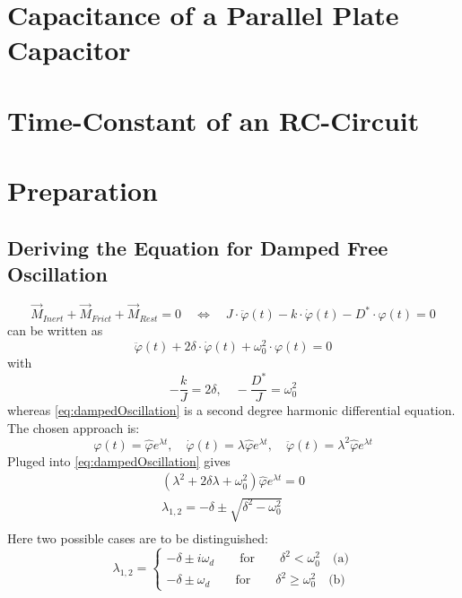 \section*{Capacitance of a Parallel Plate Capacitor}
\section*{Time-Constant of an RC-Circuit}
%
\section{Preparation}
%
\subsection*{Deriving the Equation for Damped Free Oscillation}
    \begin{equation}
        \vec{M}_{ Inert } + \vec{M}_{ Frict } + \vec{ M}_{ Rest } = 0 \quad \Leftrightarrow \quad J \cdot \ddot\varphi(t) - k \cdot \dot\varphi(t) - D^* \cdot \varphi(t) = 0
    \end{equation}
    can be written as
    \begin{equation}
        \ddot\varphi(t) + 2 \delta \cdot \dot\varphi(t) + \omega_0^2 \cdot \varphi(t) = 0
        \label{eq:dampedOscillation}
    \end{equation}
    with
    \begin{equation}
        -\frac{k}{J} = 2\delta, \quad -\frac{D^*}{J} = \omega_0^2
    \end{equation}
    whereas \cref{eq:dampedOscillation} is a second degree harmonic differential equation.
    The chosen approach is:
    \begin{equation}
        \varphi(t) = \hat{\varphi} e^{\lambda t}, \quad \dot{\varphi}(t) = \lambda \hat{\varphi} e^{\lambda t}, \quad \ddot{\varphi}(t) = \lambda^2 \hat{\varphi} e^{\lambda t}
    \end{equation}
    Pluged into \cref{eq:dampedOscillation} gives
    \begin{align}
        \left(\lambda^2 + 2\delta \lambda + \omega_0^2\right) \hat{\varphi}e^{\lambda t} = 0 \nonumber \\
        \lambda_{1,2} = -\delta \pm \sqrt{\delta^2-\omega_0^2} \nonumber \\
    \end{align}
    Here two possible cases are to be distinguished:
    \begin{equation}
        \lambda_{1,2} =
        \begin{cases}
                -\delta \pm i\omega_d \qquad \text{for} \qquad \delta^2 < \omega_0^2 \quad \text{(a)}\\
                -\delta \pm \omega_d \qquad \text{for} \qquad \delta^2 \geq \omega_0^2 \quad \text{(b)}
        \end{cases}
        \end{equation}
